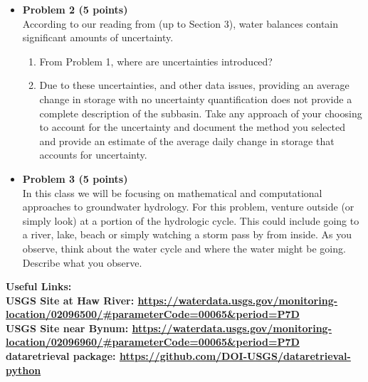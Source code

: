 \documentclass[11pt]{report}
\begin{document}
\begin{itemize}
\item {\bf Problem 2 (5 points) } \\
According to our reading from \citep{Kampf_Burges_etal_20} (up to Section 3), water balances contain significant amounts of uncertainty. 
\begin{enumerate}[label=(\roman*)]
    \item From Problem 1, where are uncertainties introduced? 
    \item Due to these uncertainties, and other data issues, providing an average change in storage with no uncertainty quantification does not provide a complete description of the subbasin. Take any approach of your choosing to account for the uncertainty and document the method you selected and provide an estimate of the average daily change in storage that accounts for uncertainty. 
\end{enumerate}

\item {\bf Problem 3 (5 points) } \\
In this class we will be focusing on mathematical and computational approaches to groundwater hydrology. For this problem, venture outside (or simply look)  at a portion of the hydrologic cycle. This could include going to a river, lake, beach or simply watching a storm pass by from inside. As you observe, think about the water cycle and where the water might be going. Describe what you observe.

\end{itemize}

\bf{Useful Links}:
\\
 USGS Site at Haw River: \url{https://waterdata.usgs.gov/monitoring-location/02096500/#parameterCode=00065&period=P7D}
\\
 USGS Site near Bynum: \url{https://waterdata.usgs.gov/monitoring-location/02096960/#parameterCode=00065&period=P7D}
\\
 dataretrieval package: \url{https://github.com/DOI-USGS/dataretrieval-python}




\end{document}
